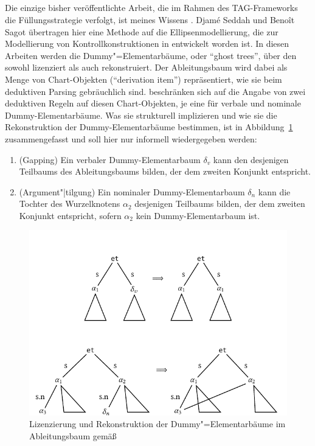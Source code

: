 \subsection{\cite{Seddah:Sagot:06}}
\largerpage
Die einzige bisher veröffentlichte Arbeit, die im Rahmen des TAG-Frameworks die Füllungsstrategie verfolgt, ist meines Wissens \cite{Seddah:Sagot:06}. Djam\'e Seddah und Beno\^{i}t Sagot übertragen hier eine Methode auf die Ellipsenmodellierung, die zur Modellierung von Kontrollkonstruktionen in \cite{Seddah:Gaiffe:05} entwickelt worden ist. In diesen Arbeiten werden die Dummy"=Elementarbäume, oder "`ghost trees"', über den  sowohl lizenziert als auch rekonstruiert. Der Ableitungsbaum wird dabei als Menge von Chart-Objekten ("`derivation item"') repräsentiert, wie sie beim deduktiven Parsing \citep{Shieber:etal:95} gebräuchlich sind. \cite{Seddah:Sagot:06} beschränken sich auf die Angabe von zwei deduktiven Regeln auf diesen Chart-Objekten, je eine für verbale und nominale Dummy-Elementarbäume. Was sie strukturell implizieren und wie sie die Rekonstruktion der Dummy-Elementarbäume bestimmen, ist in Abbildung~\ref{fig-tag-fuellung-2} zusammengefasst und soll hier nur informell wiedergegeben werden:
\begin{enumerate}
  \item (Gapping) Ein verbaler Dummy-Elementarbaum $\delta_v$ kann den  desjenigen Teilbaums des Ableitungsbaums bilden, der dem zweiten Konjunkt entspricht.
  \item (Argument"|tilgung) Ein nominaler Dummy-Elementarbaum $\delta_n$ kann die Tochter des Wurzelknotens $\alpha_2$ desjenigen Teilbaums bilden, der dem zweiten Konjunkt entspricht, sofern $\alpha_2$ kein Dummy-Elementarbaum ist.    
\end{enumerate}
\begin{figure}[t]
\centering
\includegraphics{graphics/abb825.pdf}
\caption{\label{fig-tag-fuellung-2}Lizenzierung und Rekonstruktion der Dummy"=Elementarbäume im Ableitungsbaum gemä\ss\ \cite{Seddah:Sagot:06}}
\end{figure} 
